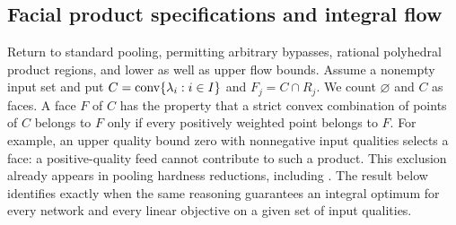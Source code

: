 \subsection{Facial product specifications and integral flow}\label{s1:faces}

Return to standard pooling, permitting arbitrary bypasses, rational
polyhedral product regions, and lower as well as upper flow bounds.
Assume a nonempty input set and put
$C=\operatorname{conv}\{\lambda_i:i\in I\}$ and $F_j=C\cap R_j$.
We count $\varnothing$ and $C$ as faces. A face $F$ of $C$ has the
property that a strict convex combination of points of $C$ belongs to
$F$ only if every positively weighted point belongs to $F$.
For example, an upper quality bound zero with nonnegative input
qualities selects a face: a positive-quality feed cannot contribute to
such a product. This exclusion already appears in pooling hardness
reductions, including \citet[Theorem~4]
{haugland2016-the-computational-complexity-of-the}. The result below
identifies exactly when the same reasoning guarantees an integral
optimum for every network and every linear objective on a given set of
input qualities.

